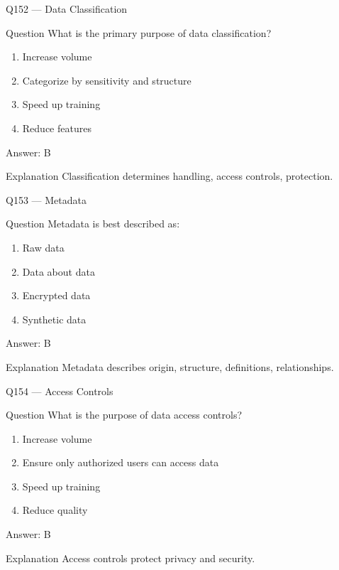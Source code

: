 \documentclass[aspectratio=169,8pt]{beamer}
\begin{document}
	\begin{frame}{Q152 --- Data Classification}
		\begin{block}{Question}
			What is the primary purpose of data classification?
		\end{block}
		\begin{enumerate}
			\item Increase volume
			\item Categorize by sensitivity and structure
			\item Speed up training
			\item Reduce features
		\end{enumerate}
		\begin{exampleblock}{Answer: B}\end{exampleblock}
		\begin{block}{Explanation}
			Classification determines handling, access controls, protection.
		\end{block}
	\end{frame}
	
	\begin{frame}{Q153 --- Metadata}
		\begin{block}{Question}
			Metadata is best described as:
		\end{block}
		\begin{enumerate}
			\item Raw data
			\item Data about data
			\item Encrypted data
			\item Synthetic data
		\end{enumerate}
		\begin{exampleblock}{Answer: B}\end{exampleblock}
		\begin{block}{Explanation}
			Metadata describes origin, structure, definitions, relationships.
		\end{block}
	\end{frame}
	
	\begin{frame}{Q154 --- Access Controls}
		\begin{block}{Question}
			What is the purpose of data access controls?
		\end{block}
		\begin{enumerate}
			\item Increase volume
			\item Ensure only authorized users can access data
			\item Speed up training
			\item Reduce quality
		\end{enumerate}
		\begin{exampleblock}{Answer: B}\end{exampleblock}
		\begin{block}{Explanation}
			Access controls protect privacy and security.
		\end{block}
	\end{frame}
	
\end{document}
